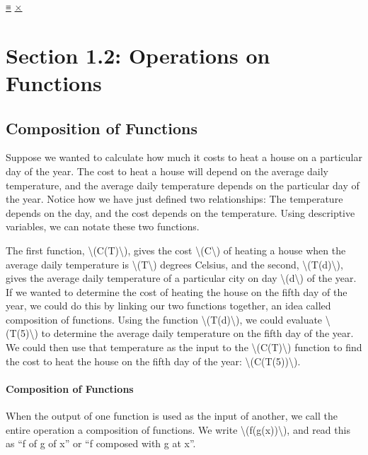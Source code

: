\protect\hyperlink{main-nav}{≡} \protect\hyperlink{close-nav}{×}

\hypertarget{section-1.2-operations-on-functions}{%
\section{Section 1.2: Operations on
Functions}\label{section-1.2-operations-on-functions}}

\hypertarget{composition-of-functions}{%
\subsection{Composition of Functions}\label{composition-of-functions}}

Suppose we wanted to calculate how much it costs to heat a house on a
particular day of the year. The cost to heat a house will depend on the
average daily temperature, and the average daily temperature depends on
the particular day of the year. Notice how we have just defined two
relationships: The temperature depends on the day, and the cost depends
on the temperature. Using descriptive variables, we can notate these two
functions.

The first function, \textbackslash{}(C(T)\textbackslash{}), gives the
cost \textbackslash{}(C\textbackslash{}) of heating a house when the
average daily temperature is \textbackslash{}(T\textbackslash{}) degrees
Celsius, and the second, \textbackslash{}(T(d)\textbackslash{}), gives
the average daily temperature of a particular city on day
\textbackslash{}(d\textbackslash{}) of the year. If we wanted to
determine the cost of heating the house on the fifth day of the year, we
could do this by linking our two functions together, an idea called
composition of functions. Using the function
\textbackslash{}(T(d)\textbackslash{}), we could evaluate
\textbackslash{}(T(5)\textbackslash{}) to determine the average daily
temperature on the fifth day of the year. We could then use that
temperature as the input to the \textbackslash{}(C(T)\textbackslash{})
function to find the cost to heat the house on the fifth day of the
year: \textbackslash{}(C(T(5))\textbackslash{}).

\hypertarget{composition-of-functions-1}{%
\paragraph{Composition of Functions}\label{composition-of-functions-1}}

When the output of one function is used as the input of another, we call
the entire operation a composition of functions. We write
\textbackslash{}(f(g(x))\textbackslash{}), and read this as ``f of g of
x'' or ``f composed with g at x''.

